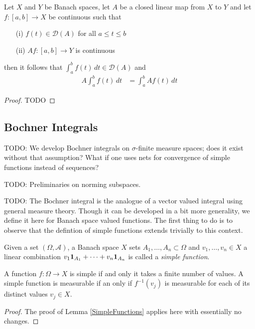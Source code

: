 \begin{prop}\label{ClosedOperatorOfRiemannIntegral}Let $X$ and $Y$ be
  Banach spaces, let $A$ be a closed linear map from $X$ to $Y$ and
  let $f : [a,b] \to X$ be continuous such that
\begin{itemize}
\item[(i)] $f(t) \in \mathcal{D}(A)$ for all $a \leq t \leq b$
\item[(ii)] $Af : [a,b] \to Y$ is continuous
\end{itemize}
then it follows that $\int_a^b f(t) \, dt \in \mathcal{D}(A)$ and
\begin{align*}
A \int_a^b f(t) \, dt &= \int_a^b A f(t) \, dt
\end{align*}
\end{prop}
\begin{proof}

TODO
\end{proof}

\subsection{Bochner Integrals}

TODO: We develop Bochner integrals on $\sigma$-finite measure spaces;
does it exist without that assumption?  What if one uses nets for
convergence of simple functions instead of sequences?

TODO: Preliminaries on norming subspaces.

TODO:
The Bochner integral is the analogue of a vector valued integral using
general measure theory.  Though it can be developed in a bit more
generality, we define it here for Banach space valued functions.  
The first thing to do is to observe that the defintion of simple functions
extends trivially to this context.
\begin{defn}Given a set $(\Omega, \mathcal{A})$, a Banach space $X$
  sets $A_1, \dotsc, A_n \subset \Omega$ and $v_1, \dotsc, v_n \in X$ a
  linear combination $v_1
  \textbf{1}_{A_1} + \cdots + v_n \textbf{1}_{A_n}$ is called
  a \emph{simple function}.
\end{defn}

\begin{lem}\label{SimpleVectorValuedFunctions}A function $f : \Omega \to X$ is simple if and only it
  takes a finite number of values.  A simple function is measurable if
  an only if $f^{-1}(v_j)$ is measurable for each of its distinct
  values $v_j \in X$.
\end{lem}
\begin{proof}
The proof of Lemma \ref{SimpleFunctions} applies here with essentially
no changes.
\end{proof}

